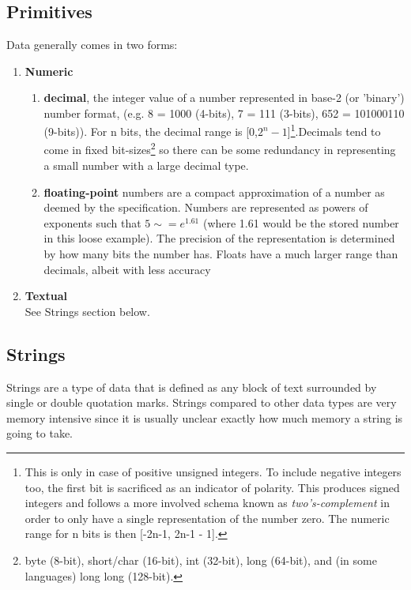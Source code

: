 \subsection{Primitives}\label{ref:app:primitives}

Data generally comes in two forms:

\begin{enumerate}
\item{{\bf Numeric}
	\begin{enumerate}
	\item{\textbf{decimal}, the integer value of a number represented in base-2 (or 'binary') number format, (e.g. 8 = 1000 (4-bits), 7 = 111 (3-bits), 652 = 101000110 (9-bits)). For n bits, the decimal range is [0,$2^n - 1$]\footnote{This is only in case of positive unsigned integers. To include negative integers too, the first bit is sacrificed as an indicator of polarity. This produces signed integers and follows a more involved schema known as \textit{two's-complement} in order to only have a single representation of the number zero. The numeric range for n bits is then [-2n-1, 2n-1 - 1].}.Decimals tend to come in fixed bit-sizes\footnote{byte (8-bit), short/char (16-bit), int (32-bit), long (64-bit), and (in some languages) long long (128-bit).} so there can be some redundancy in representing a small number with a large decimal type.}
	\item{\textbf{floating-point} numbers are a compact approximation of a number as deemed by the specification\citep{floats}. Numbers are represented as powers of exponents such that $5 \sim= e^{1.61}$ (where 1.61 would be the stored number in this loose example). The precision of the representation is determined by how many bits the number has. Floats have a much larger range than decimals, albeit with less accuracy}
	\end{enumerate}
}
\item{{\bf Textual}\\See Strings section below.}
\end{enumerate}


\subsection{Strings}\label{ref:app:strings}
Strings are a type of data that is defined as any block of text surrounded by single or double quotation marks. Strings compared to other data types are very memory intensive since it is usually unclear exactly how much memory a string is going to take.

